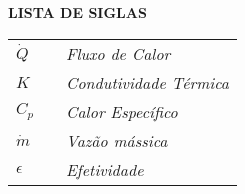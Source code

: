 \begin{center}
	\textbf {LISTA DE SIGLAS}
\end{center}
\vspace{0.5cm}
\begin{flushleft}

	\begin{tabularx}{12cm}{X X l}
		$\dot{Q}$ &  &  \itshape Fluxo de Calor\\
		$K$ &  &  \itshape Condutividade Térmica\\
		$C_{p}$ &  &  \itshape Calor Específico\\
		$\dot{m}$ &  &  \itshape Vazão mássica\\
		$\epsilon$ &  &  \itshape Efetividade
		
	\end{tabularx}
\end{flushleft}
\thispagestyle{empty}